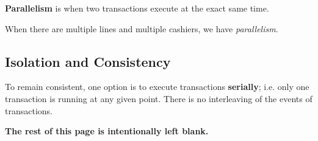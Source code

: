 \documentclass{report}
\newenvironment{definition}[1]{\begin{tcolorbox}[title={Definition: #1}]}{\end{tcolorbox}}
\newenvironment{example}{\begin{tcolorbox}[title={Example},colback=green!5!white,colframe=black!75!green]}{\end{tcolorbox}}
\renewcommand{\bf}[1]{\textbf{{#1}}}
\renewcommand{\it}[1]{\textit{{#1}}}
\begin{document}
\begin{definition}{Parallelism}
    \bf{Parallelism} is when two transactions execute at the exact same time.
\end{definition}
\begin{example}
    When there are multiple lines and multiple cashiers, we have
    \it{parallelism}.
\end{example}

\subsection{Isolation and Consistency}
\label{subsec:iso}
To remain consistent, one option is to execute transactions \bf{serially}; i.e.
only one transaction is running at any given point. There is no interleaving of
the events of transactions.
\vspace{5em}

\begin{center}
    \bf{The rest of this page is intentionally left blank.}
\end{center}
\end{document}
